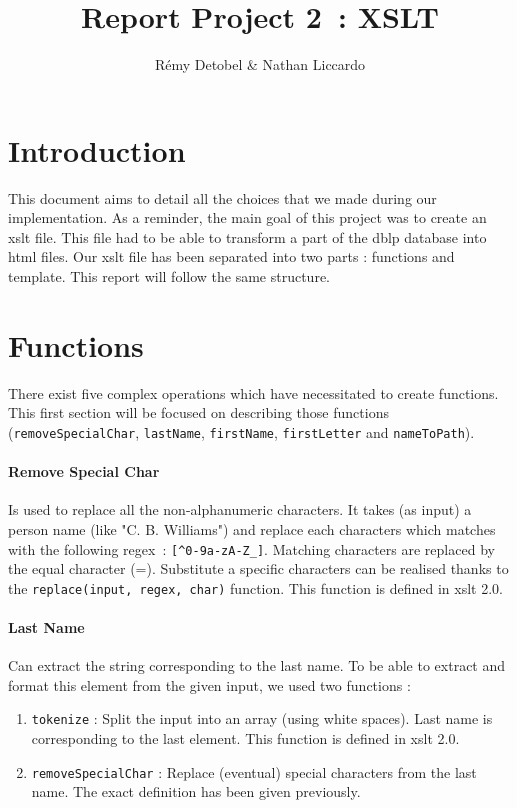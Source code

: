 \documentclass{article}
\author{R\'emy Detobel \& Nathan Liccardo}
\title{Report Project 2~: XSLT}
\begin{document}
\maketitle

\section{Introduction}
This document aims to detail all the choices that we made during our implementation. As a reminder, the main goal of this project was to create an xslt file. This file had to be able to transform a part of the dblp database into html files. Our xslt file has been separated into two parts : functions and template. This report will follow the same structure.

\section{Functions}
There exist five complex operations which have necessitated to create functions. This first section will be focused on describing those functions (\verb|removeSpecialChar|, \verb|lastName|, \verb|firstName|, \verb|firstLetter| and \verb|nameToPath|).

\paragraph{Remove Special Char} Is used to replace all the non-alphanumeric characters. It takes (as input) a person name (like "C. B. Williams") and replace each characters which matches with the following regex~: \verb|[^0-9a-zA-Z_]|. Matching characters are replaced by the equal character (=). Substitute a specific characters can be realised thanks to the \verb|replace(input, regex, char)| function. This function is defined in xslt 2.0.

\paragraph{Last Name} Can extract the string corresponding to the last name. To be able to extract and format this element from the given input, we used two functions : 
\begin{enumerate}
\item \verb|tokenize| : Split the input into an array (using white spaces). Last name is corresponding to the last element. This function is defined in xslt 2.0.
\item \verb|removeSpecialChar| : Replace (eventual) special characters from the last name. The exact definition has been given previously.
\end{enumerate}
\end{document}

